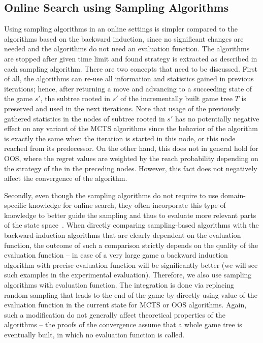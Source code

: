 \subsection{Online Search using Sampling Algorithms}
Using sampling algorithms in an online settings is simpler compared to the algorithms based on the backward induction, since no significant changes are needed and the algorithms do not need an evaluation function.
The algorithms are stopped after given time limit and found strategy is extracted as described in each sampling algorithm.
There are two concepts that need to be discussed. 
First of all, the algorithms can re-use all information and statistics gained in previous iterations; hence, after returning a move and advancing to a succeeding state of the game $s'$, the subtree rooted in $s'$ of the incrementally built game tree $T$ is preserved and used in the next iterations. 
Note that usage of the previously gathered statistics in the nodes of subtree rooted in $s'$ has no potentially negative effect on any variant of the MCTS algorithms since the behavior of the algorithm is exactly the same when the iteration is started in this node, or this node reached from its predecessor. On the other hand, this does not in general hold for OOS, where the regret values are weighted by the reach probability depending on the strategy of the in the preceding nodes. However, this fact does not negatively affect the convergence of the algorithm.

Secondly, even though the sampling algorithms do not require to use domain-specific knowledge for online search, they often incorporate this type of knowledge to better guide the sampling and thus to evaluate more relevant parts of the state space~\cite{}. When directly comparing sampling-based algorithms with the backward-induction algorithms that are clearly dependent on the evaluation function, the outcome of such a comparison strictly depends on the quality of the evaluation function -- in case of a very large game a backward induction algorithm with precise evaluation function will be significantly better (we will see such examples in the experimental evaluation). Therefore, we also use sampling algorithms with evaluation function. The integration is done via replacing random sampling that leads to the end of the game by directly using value of the evaluation function in the current state for MCTS or OOS algorithms. Again, such a modification do not generally affect theoretical properties of the algorithms -- the proofs of the convergence assume that a whole game tree is eventually built, in which no evaluation function is called.
